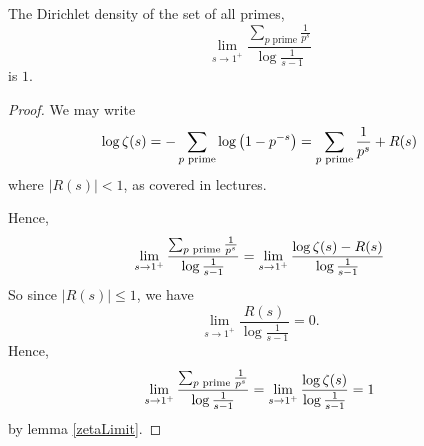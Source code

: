 \documentclass{unswmaths}
\begin{document}
    \begin{theorem}
        The Dirichlet density of the set of all primes,
        \begin{equation*}
            \lim_{s\rightarrow 1^+} \frac{\sum_{p\;\mathrm{prime}} \frac{1}{p^s}}{\log\frac{1}{s-1}}
        \end{equation*}
        is $1$. 
    \end{theorem}
    \begin{proof}
        We may write 
        \begin{equation*}
            \log\zeta(s) = -\sum_{{p\text{ prime}}} \log\left(1-p^{-s}\right) = \sum_{{p\text{ prime}}}\frac{1}{p^s}+R(s)
        \end{equation*}
        where $|R(s)| < 1$, as covered in lectures.
        
        Hence,
        \begin{equation*}
            \lim_{s\rightarrow 1^+} \frac{\sum_{{p\text{ prime}}}\frac{1}{p^s}}{\log\frac{1}{s-1}} = \lim_{s\rightarrow 1^+} \frac{\log\zeta(s)-R(s)}{\log\frac{1}{s-1}}
        \end{equation*}
        So since $|R(s)| \leq 1$, we have
        \begin{equation*}
            \lim_{s\rightarrow 1^+} \frac{R(s)}{\log\frac{1}{s-1}} = 0.
        \end{equation*}
        Hence,
        \begin{equation*}
            \lim_{s\rightarrow 1^+} \frac{\sum_{{p\text{ prime}}}\frac{1}{p^s}}{\log\frac{1}{s-1}} = \lim_{s\rightarrow 1^+} \frac{\log\zeta(s)}{\log\frac{1}{s-1}} = 1
        \end{equation*}
        by lemma \ref{zetaLimit}. 
    \end{proof}
    
\end{document}
